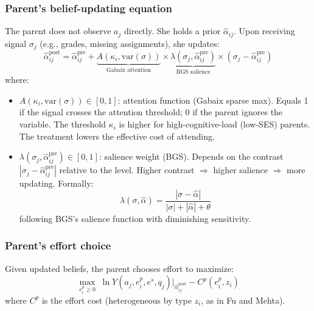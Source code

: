 \documentclass[11pt]{article}
\begin{document}
\subsubsection{Parent's belief-updating equation}
The parent does not observe $a_j$ directly. She holds a prior $\hat{\alpha}_{ij}$. Upon receiving signal $\sigma_j$ (e.g., grades, missing assignments), she updates:
\[
\hat{\alpha}_{ij}^{\text{post}} = \hat{\alpha}_{ij}^{\text{pre}} + \underbrace{A(\kappa_i, \text{var}(\sigma))}_{\text{Gabaix attention}} \times \underbrace{\lambda(\sigma_j, \hat{\alpha}_{ij}^{\text{pre}})}_{\text{BGS salience}} \times (\sigma_j - \hat{\alpha}_{ij}^{\text{pre}})
\]
where:
\begin{itemize}
  \item $A(\kappa_i, \text{var}(\sigma)) \in [0,1]$: attention function (Gabaix sparse max). Equals 1 if the signal crosses the attention threshold; 0 if the parent ignores the variable. The threshold $\kappa_i$ is higher for high-cognitive-load (low-SES) parents. The treatment lowers the effective cost of attending.
  \item $\lambda(\sigma_j, \hat{\alpha}_{ij}^{\text{pre}}) \in [0,1]$: salience weight (BGS). Depends on the contrast $|\sigma_j - \hat{\alpha}_{ij}^{\text{pre}}|$ relative to the level. Higher contrast $\Rightarrow$ higher salience $\Rightarrow$ more updating. Formally:
  \[
  \lambda(\sigma, \hat{\alpha}) = \frac{|\sigma - \hat{\alpha}|}{|\sigma| + |\hat{\alpha}| + \theta}
  \]
  following BGS's salience function with diminishing sensitivity.
\end{itemize}

\subsubsection{Parent's effort choice}
Given updated beliefs, the parent chooses effort to maximize:
\[
\max_{e^p_i \geq 0} \; \ln Y(a_j, e^p_i, e^s, q_j) \Big|_{\hat{\alpha}_{ij}^{\text{post}}} - C^p(e^p_i, z_i)
\]
where $C^p$ is the effort cost (heterogeneous by type $z_i$, as in Fu and Mehta).
\end{document}
